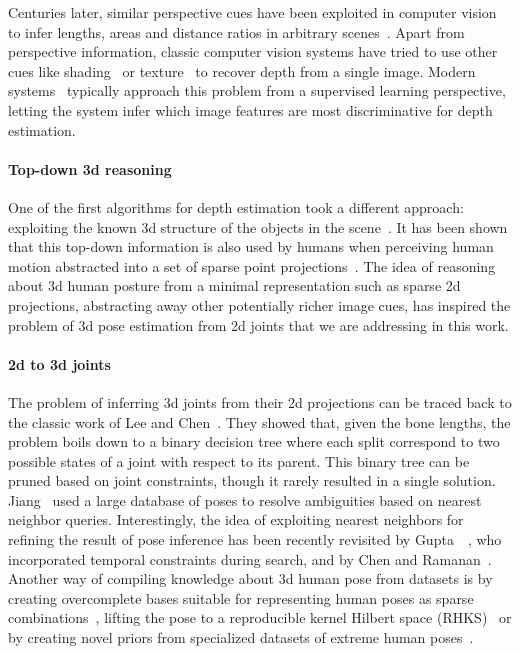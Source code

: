 \documentclass[10pt,twocolumn,letterpaper]{article}
\begin{document}
Centuries later, similar perspective cues have been exploited in computer vision to infer lengths, areas and distance ratios in arbitrary scenes~\cite{zisserman99}. Apart from perspective information, 
classic computer vision systems have tried to use other cues like shading~\cite{zhang_shapefromshading} or  texture~\cite{lindeberg_shapefromtexture} to recover depth from a single image. Modern systems~\cite{saxena_2D_3D, fergus_2D_3D_iccv2015, liu_2d_3d_cvpr_2015, popa_cvpr17} typically approach this problem from a supervised learning perspective, letting the system infer which image features are most discriminative for depth estimation.

\paragraph{Top-down 3d reasoning}
One of the first algorithms for depth estimation took a different approach: exploiting the known 3d structure of the objects in the scene~\cite{roberts_63}. 
It has been shown that this top-down information is also used by humans when perceiving human motion abstracted into a set of sparse point projections~\cite{bulthoff1998top}. The idea of reasoning about 3d human posture from a minimal representation such as sparse 2d projections, abstracting away other potentially richer image cues, has inspired the problem of 3d pose estimation from 2d joints that we are 
addressing in this work.

\paragraph{2d to 3d joints}
The problem of inferring 3d joints from their 2d projections can be traced back to the classic work of Lee and Chen~\cite{Chen85b}. They showed that, given the bone lengths, the problem boils down to a binary decision tree where each split correspond to two possible states of a joint with respect to its parent.
This binary tree can be pruned based on joint constraints, though it rarely resulted in a single solution. Jiang~\cite{jiang_10} used a large database of poses to resolve ambiguities based on nearest neighbor queries. Interestingly, the idea of exploiting nearest neighbors for refining the result of pose inference has been recently revisited by Gupta~\etal~\cite{gupta20143dpose}, who incorporated temporal constraints during search, and by Chen and Ramanan~\cite{ChenR16a}. Another way of compiling knowledge about 3d human pose from datasets is by creating overcomplete bases suitable for representing human poses as sparse combinations~\cite{Ramakrishna:2012, wang2014robust,akhter-and-black,keep-it-simpl,zhou2016sparseness,zhou2016sparse}, 
lifting the pose to a reproducible kernel Hilbert space (RHKS)~\cite{ionescu_cvpr14}
or by creating novel priors from specialized datasets of extreme human poses~\cite{akhter-and-black}.
\end{document}
